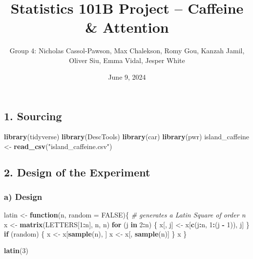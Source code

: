 \documentclass[
]{article}
\title{Statistics 101B Project -- Caffeine \& Attention}
\author{Group 4: Nicholas Cassol-Pawson, Max Chalekson, Romy Gou, Kanzah
Jamil, Oliver Siu, Emma Vidal, Jesper White}
\date{June 9, 2024}
\newenvironment{Shaded}{\begin{snugshade}}{\end{snugshade}}
\newcommand{\AttributeTok}[1]{\textcolor[rgb]{0.13,0.29,0.53}{#1}}
\newcommand{\CommentTok}[1]{\textcolor[rgb]{0.56,0.35,0.01}{\textit{#1}}}
\newcommand{\ConstantTok}[1]{\textcolor[rgb]{0.56,0.35,0.01}{#1}}
\newcommand{\ControlFlowTok}[1]{\textcolor[rgb]{0.13,0.29,0.53}{\textbf{#1}}}
\newcommand{\DecValTok}[1]{\textcolor[rgb]{0.00,0.00,0.81}{#1}}
\newcommand{\FunctionTok}[1]{\textcolor[rgb]{0.13,0.29,0.53}{\textbf{#1}}}
\newcommand{\NormalTok}[1]{#1}
\newcommand{\OtherTok}[1]{\textcolor[rgb]{0.56,0.35,0.01}{#1}}
\newcommand{\SpecialCharTok}[1]{\textcolor[rgb]{0.81,0.36,0.00}{\textbf{#1}}}
\newcommand{\StringTok}[1]{\textcolor[rgb]{0.31,0.60,0.02}{#1}}
\begin{document}
\maketitle

\subsection{1. Sourcing}\label{sourcing}

\begin{Shaded}
\begin{Highlighting}[]
\FunctionTok{library}\NormalTok{(tidyverse)}
\FunctionTok{library}\NormalTok{(DescTools)}
\FunctionTok{library}\NormalTok{(car)}
\FunctionTok{library}\NormalTok{(pwr)}
\NormalTok{island\_caffeine }\OtherTok{\textless{}{-}} \FunctionTok{read\_csv}\NormalTok{(}\StringTok{"island\_caffeine.csv"}\NormalTok{)}
\end{Highlighting}
\end{Shaded}

\subsection{2. Design of the Experiment}\label{design-of-the-experiment}

\subsubsection{a) Design}\label{a-design}

\begin{Shaded}
\begin{Highlighting}[]
\NormalTok{latin }\OtherTok{\textless{}{-}} \ControlFlowTok{function}\NormalTok{(n, }\AttributeTok{random =} \ConstantTok{FALSE}\NormalTok{)\{}
  \CommentTok{\# generates a Latin Square of order n}
\NormalTok{  x }\OtherTok{\textless{}{-}} \FunctionTok{matrix}\NormalTok{(LETTERS[}\DecValTok{1}\SpecialCharTok{:}\NormalTok{n], n, n)}
  \ControlFlowTok{for}\NormalTok{ (j }\ControlFlowTok{in} \DecValTok{2}\SpecialCharTok{:}\NormalTok{n) \{}
\NormalTok{    x[, j] }\OtherTok{\textless{}{-}}\NormalTok{ x[}\FunctionTok{c}\NormalTok{(j}\SpecialCharTok{:}\NormalTok{n, }\DecValTok{1}\SpecialCharTok{:}\NormalTok{(j }\SpecialCharTok{{-}} \DecValTok{1}\NormalTok{)), j]}
\NormalTok{  \}}
  \ControlFlowTok{if}\NormalTok{ (random) \{}
\NormalTok{    x }\OtherTok{\textless{}{-}}\NormalTok{ x[}\FunctionTok{sample}\NormalTok{(n), ]}
\NormalTok{    x }\OtherTok{\textless{}{-}}\NormalTok{ x[, }\FunctionTok{sample}\NormalTok{(n)]}
\NormalTok{  \}}
\NormalTok{  x}
\NormalTok{\}}

\FunctionTok{latin}\NormalTok{(}\DecValTok{3}\NormalTok{)}
\end{Highlighting}
\end{Shaded}
\end{document}
